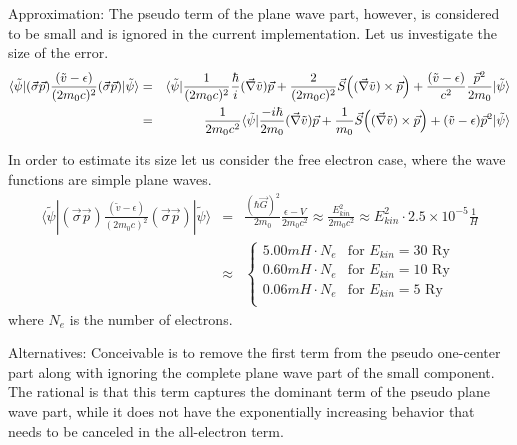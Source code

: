 \documentclass[11pt,a4paper]{report}
\begin{document}
Approximation: 
The pseudo term of the plane wave part, however, is considered to be
small and is ignored in the current implementation. Let us investigate
the size of the error.
\begin{eqnarray*}
\langle\tilde\psi|
(\vec{\sigma}\vec{p})\frac{(\tilde{v}-\epsilon)}{(2m_0c)^2}(\vec{\sigma}\vec{p})
|\tilde{\psi}\rangle &=& \langle\tilde\psi|
\frac{1}{(2m_0c)^2}\frac{\hbar}{i}(\vec{\nabla}\tilde{v})\vec{p}
+\frac{2}{(2m_0c)^2}
\vec{S}\Bigl((\vec{\nabla}\tilde{v})\times\vec{p}\Bigr)
+\frac{(\tilde{v}-\epsilon)}{c^2} \frac{\vec{p}^2}{2m_0}
|\tilde{\psi}\rangle \nonumber\\ &=&
\frac{1}{2m_0c^2}\langle\tilde\psi|
\frac{-i\hbar}{2m_0}(\vec{\nabla}\tilde{v})\vec{p} +\frac{1}{m_0}
\vec{S}\Bigl((\vec{\nabla}\tilde{v})\times\vec{p}\Bigr)
+(\tilde{v}-\epsilon)\vec{p}^2 |\tilde{\psi}\rangle
\end{eqnarray*}


In order to estimate its size let us consider the free electron case,
where the wave functions are simple plane waves.
\begin{eqnarray*}
\langle\tilde\psi|
(\vec{\sigma}\vec{p})\frac{(\tilde{v}-\epsilon)}{(2m_0c)^2}(\vec{\sigma}\vec{p})
|\tilde{\psi}\rangle
&=&\frac{(\hbar\vec{G})^2}{2m_0}\frac{\epsilon-V}{2m_0c^2}
\approx \frac{E_{kin}^2}{2m_0c^2}\approx E^2_{kin} \cdot 2.5
\times10^{-5}\frac{1}{H}
\nonumber\\
&\approx&
\begin{cases}
5.00 mH\cdot N_e &\text{for $E_{kin}=30$~Ry}\\
0.60 mH\cdot N_e &\text{for $E_{kin}=10$~Ry}\\
0.06 mH\cdot N_e &\text{for $E_{kin}=5$~Ry}\\
\end{cases}
\end{eqnarray*}
where $N_e$ is the number of electrons.

Alternatives: Conceivable is to remove the first term from the pseudo
one-center part along with ignoring the complete plane wave part of
the small component. The rational is that this term captures the
dominant term of the pseudo plane wave part, while it does not have
the exponentially increasing behavior that needs to be canceled in the
all-electron term.
\end{document}
